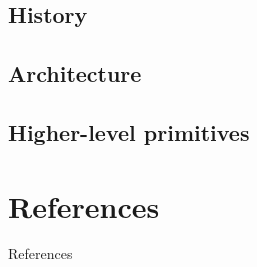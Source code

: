 \documentclass{beamer}
\begin{document}
\subsection{History}
\subsection{Architecture}
\subsection{Higher-level primitives}


\section{References}
\begin{frame}[allowframebreaks]{References}
 
\end{frame}
\end{document}
